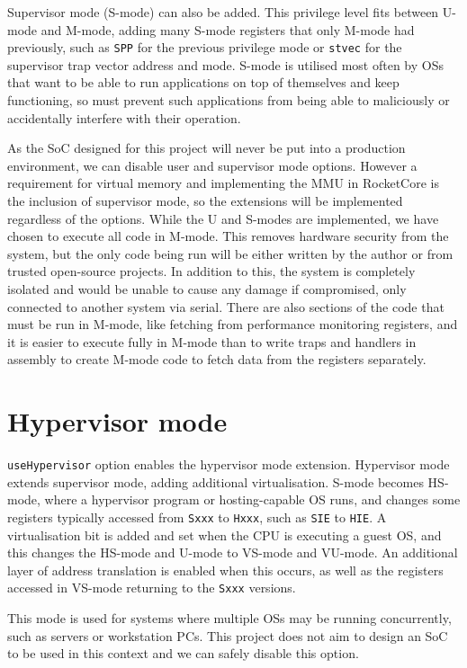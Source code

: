 Supervisor mode (S-mode) can also be added. This privilege level fits between U-mode and M-mode, adding many S-mode registers that only M-mode had previously, such as \texttt{SPP} for the previous privilege mode or \texttt{stvec} for the supervisor trap vector address and mode. S-mode is utilised most often by OSs that want to be able to run applications on top of themselves and keep functioning, so must prevent such applications from being able to maliciously or accidentally interfere with their operation.

As the SoC designed for this project will never be put into a production environment, we can disable user and supervisor mode options. However a requirement for virtual memory and implementing the MMU in RocketCore is the inclusion of supervisor mode, so the extensions will be implemented regardless of the options. While the U and S-modes are implemented, we have chosen to execute all code in M-mode. This removes hardware security from the system, but the only code being run will be either written by the author or from trusted open-source projects. In addition to this, the system is completely isolated and would be unable to cause any damage if compromised, only connected to another system via serial. There are also sections of the code that must be run in M-mode, like fetching from performance monitoring registers, and it is easier to execute fully in M-mode than to write traps and handlers in assembly to create M-mode code to fetch data from the registers separately.

\section{Hypervisor mode}
\texttt{useHypervisor} option enables the hypervisor mode extension. Hypervisor mode extends supervisor mode, adding additional virtualisation. S-mode becomes HS-mode, where a hypervisor program or hosting-capable OS runs, and changes some registers typically accessed from \texttt{Sxxx} to \texttt{Hxxx}, such as \texttt{SIE} to \texttt{HIE}. A virtualisation bit is added and set when the CPU is executing a guest OS, and this changes the HS-mode and U-mode to VS-mode and VU-mode. An additional layer of address translation is enabled when this occurs, as well as the registers accessed in VS-mode returning to the \texttt{Sxxx} versions.

This mode is used for systems where multiple OSs may be running concurrently, such as servers or workstation PCs. This project does not aim to design an SoC to be used in this context and we can safely disable this option.

